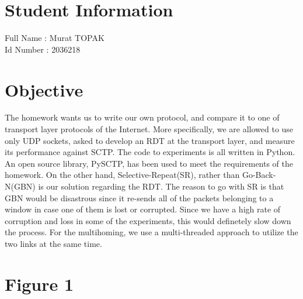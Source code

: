 \documentclass[12pt]{article}
\begin{document}
\section*{Student Information } 
Full Name :  Murat TOPAK\\
Id Number :  2036218\\

\section*{Objective}

The homework wants us to write our own protocol, and compare it to one of transport layer protocols of the Internet. More specifically, we are allowed to use only UDP sockets, asked to develop an RDT at the transport layer, and measure its performance against SCTP.
The code to experiments is all written in Python. An open source library, PySCTP, has been used to meet the requirements of the homework. On the other hand, Selective-Repeat(SR), rather than Go-Back-N(GBN) is our solution regarding the RDT. The reason to go with SR is that GBN would be disastrous since it re-sends all of the packets belonging to a window in case one of them is lost or corrupted. Since we have a high rate of corruption and loss in some of the experiments, this would definetely slow down the process. For the multihoming, we use a multi-threaded approach to utilize the two links at the same time.



\section*{Figure 1}
\end{document}
